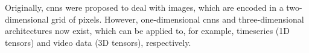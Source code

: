 
Originally, \glspl{cnn} were proposed to deal with images,
which are encoded in a two-dimensional grid of pixels.
However, one-dimensional \glspl{cnn} and three-dimensional
architectures now exist, which can be applied to, for
example, timeseries (1D tensors) and video data (3D
tensors), respectively.

